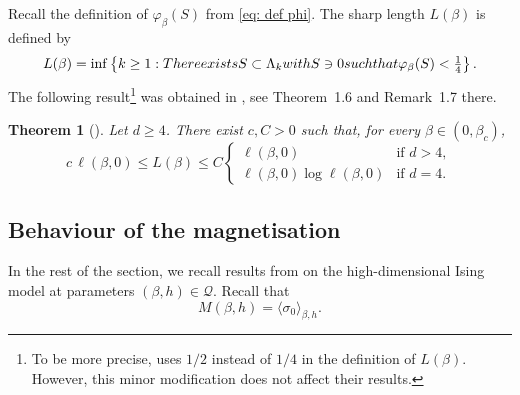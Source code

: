 \documentclass[10pt,a4paper]{amsart}
\numberwithin{equation}{section}
\newtheorem{Thm}{Theorem}[section]
\begin{document}
Recall the definition of $\varphi_{\beta}(S)$ from \eqref{eq: def phi}. The sharp length $L(\beta)$ is defined by 
\begin{equation}\label{eq:def L(beta)}
    L(\beta)=\inf\left\lbrace k\geq 1: \textup{ There exists } S\subset \Lambda_k \textup{ with }S\ni 0 \textup{ such that } \varphi_{\beta}(S)< \tfrac{1}{4}\right\rbrace.
\end{equation}
The following result\footnote{To be more precise, \cite{DuminilPanis2024newLB} uses $1/2$ instead of $1/4$ in the definition of $L(\beta)$. However, this minor modification does not affect their results.} was obtained in \cite{DuminilPanis2024newLB}, see Theorem~1.6 and Remark~1.7 there.
\begin{Thm}[{}]\label{thm:sharplength} Let $d\geq 4$. There exist $c,C>0$ such that, for every $\beta\in (0,\beta_c)$,
\begin{equation}
	c\,\ell(\beta,0)\leq L(\beta)\leq C\left\{
			\begin{array}{ll}
				\ell(\beta,0) & \mbox{if } d>4, \\
				\ell(\beta,0)\log \ell(\beta,0) & \mbox{if }d=4.
			\end{array}
			\right.
\end{equation}
\end{Thm}
%
%


\subsection{Behaviour of the magnetisation}
In the rest of the section, we recall results from \cite{AizenmanFernandezCriticalBehaviorMagnetization1986} on the high-dimensional Ising model at parameters $(\beta,h)\in \mathcal Q$. Recall that
\begin{equation}
	M(\beta,h)=\langle \sigma_0\rangle_{\beta,h}.
\end{equation}
\end{document}
